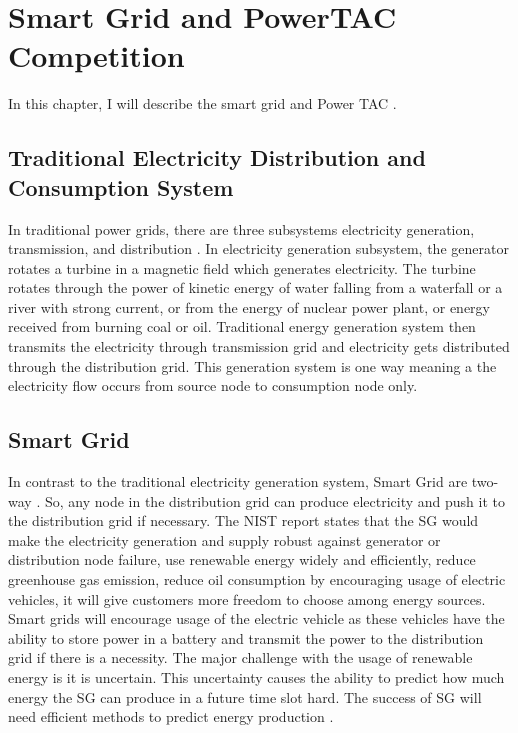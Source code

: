 
\chapter{Smart Grid and PowerTAC Competition}

In this chapter, I will describe the smart grid \cite{fang2012smart} and Power TAC \cite{ketter2013power}.

\section{Traditional Electricity Distribution and Consumption System}
In traditional power grids, there are three subsystems electricity generation, transmission, and distribution \cite{fang2012smart}. In electricity generation subsystem, the generator rotates a turbine in a magnetic field which generates electricity. The turbine rotates through the power of kinetic energy of water falling from a waterfall or a river with strong current, or from the energy of nuclear power plant, or energy received from burning coal or oil. Traditional energy generation system then transmits the electricity through transmission grid and electricity gets distributed through the distribution grid. This generation system is one way meaning a the electricity flow occurs from source node to consumption node only.



\section{Smart Grid}
In contrast to the traditional electricity generation system, Smart Grid are two-way \cite{fang2012smart}. So, any node in the distribution grid can produce electricity and push it to the distribution grid if necessary. The NIST report \cite{fang2012smart} states that the SG would make the electricity generation and supply robust against generator or distribution node failure, use renewable energy widely and efficiently, reduce greenhouse gas emission, reduce oil consumption by encouraging usage of electric vehicles, it will give customers more freedom to choose among energy sources. Smart grids will encourage usage of the electric vehicle as these vehicles have the ability to store power in a battery and transmit the power to the distribution grid if there is a necessity. The major challenge with the usage of renewable energy is it is uncertain. This uncertainty causes the ability to predict how much energy the SG can produce in a future time slot hard. The success of SG will need efficient methods to predict energy production \cite{potter2009building}.


